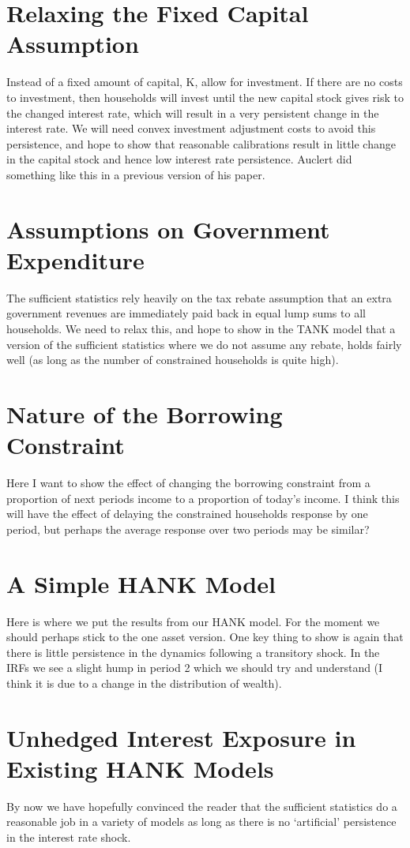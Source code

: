 \documentclass[titlepage]{\econtex}\newcommand{\texname}{ConsumptionHeterogeneity}
\begin{document}
\section{Relaxing the Fixed Capital Assumption}
Instead of a fixed amount of capital, K, allow for investment. If there are no costs to investment, then households will invest until the new capital stock gives risk to the changed interest rate, which will result in a very persistent change in the interest rate. We will need convex investment adjustment costs to avoid this persistence, and hope to show that reasonable calibrations result in little change in the capital stock and hence low interest rate persistence. Auclert did something like this in a previous version of his paper.

\section{Assumptions on Government Expenditure}
The sufficient statistics rely heavily on the tax rebate assumption that an extra government revenues are immediately paid back in equal lump sums to all households. We need to relax this, and hope to show in the TANK model that a version of the sufficient statistics where we do not assume any rebate, holds fairly well (as long as the number of constrained households is quite high).

\section{Nature of the Borrowing Constraint}
Here I want to show the effect of changing the borrowing constraint from a proportion of next periods income to a proportion of today's income. I think this will have the effect of delaying the constrained households response by one period, but perhaps the average response over two periods may be similar?

\section{A Simple HANK Model}
Here is where we put the results from our HANK model. For the moment we should perhaps stick to the one asset version. One key thing to show is again that there is little persistence in the dynamics following a transitory shock. In the IRFs we see a slight hump in period 2 which we should try and understand (I think it is due to a change in the distribution of wealth).

\section{Unhedged Interest Exposure in Existing HANK Models}
By now we have hopefully convinced the reader that the sufficient statistics do a reasonable job in a variety of models as long as there is no `artificial' persistence in the interest rate shock.
\end{document}
